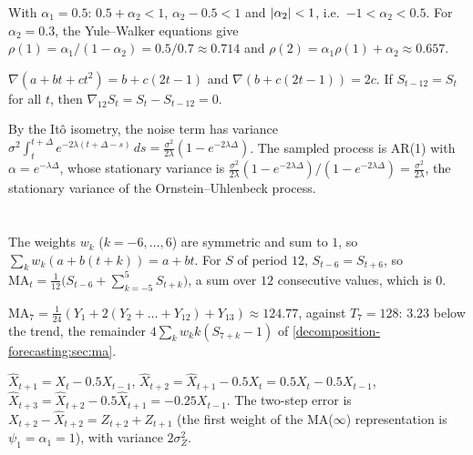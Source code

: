 With $\alpha_1 = 0.5$: $0.5 + \alpha_2<1$, $\alpha_2 - 0.5<1$ and $\left|\alpha_2\right|<1$, i.e.\ $-1<\alpha_2<0.5$. For $\alpha_2 = 0.3$, the Yule--Walker
equations give $\rho(1) = \alpha_1/(1 - \alpha_2) = 0.5/0.7\approx0.714$ and $\rho(2) = \alpha_1\rho(1) + \alpha_2\approx0.657$.

$\nabla(a + bt + ct^2) = b + c(2t - 1)$ and $\nabla(b + c(2t - 1)) = 2c$. If $S_{t-12} = S_t$ for all $t$, then
$\nabla_{12}S_t = S_t - S_{t-12} = 0$.

By the Itô isometry, the noise term has variance $\sigma^2\int_t^{t+\Delta}e^{-2\lambda(t+\Delta-s)}\,ds = \frac{\sigma^2}{2\lambda}(1 - e^{-2\lambda\Delta})$. The sampled
process is AR(1) with $\alpha = e^{-\lambda\Delta}$, whose stationary variance is
$\frac{\sigma^2}{2\lambda}(1 - e^{-2\lambda\Delta})/(1 - e^{-2\lambda\Delta}) = \frac{\sigma^2}{2\lambda}$, the stationary variance of the Ornstein--Uhlenbeck process.

\section{}

The weights $w_k$ ($k = -6,\dots,6$) are symmetric and sum to $1$, so $\sum_kw_k(a + b(t + k)) = a + bt$. For $S$ of
period $12$, $S_{t-6} = S_{t+6}$, so $\mathrm{MA}_t = \frac1{12}\bigl(S_{t-6} + \sum_{k=-5}^5S_{t+k}\bigr)$, a sum over $12$ consecutive
values, which is $0$.

$\mathrm{MA}_7 = \frac1{24}(Y_1 + 2(Y_2 + \dots + Y_{12}) + Y_{13})\approx124.77$, against $T_7 = 128$: $3.23$ below the trend, the
remainder $4\sum_kw_kk(S_{7+k} - 1)$ of \cref{decomposition-forecasting:sec:ma}.

$\hat X_{t+1} = X_t - 0.5X_{t-1}$, $\hat X_{t+2} = \hat X_{t+1} - 0.5X_t = 0.5X_t - 0.5X_{t-1}$,
$\hat X_{t+3} = \hat X_{t+2} - 0.5\hat X_{t+1} = -0.25X_{t-1}$. The two-step error is $X_{t+2} - \hat X_{t+2} = Z_{t+2} + Z_{t+1}$ (the first
weight of the MA($\infty$) representation is $\psi_1 = \alpha_1 = 1$), with variance $2\sigma_Z^2$.

\section{}


